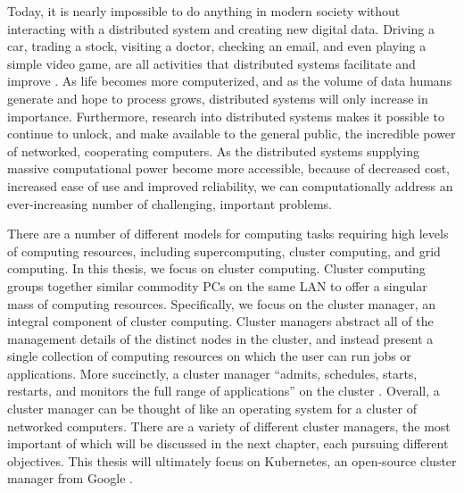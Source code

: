 Today, it is nearly impossible to do
anything in modern society without interacting with a distributed system and
creating new digital data. Driving a car, trading a stock, visiting a doctor,
checking an email, and even playing a simple video game, are all activities that
distributed systems facilitate and improve \cite{distributed-systems-concepts-and-design}.
As life becomes more
computerized, and as the volume of data humans generate and hope to process
grows, distributed systems will only increase in importance.
Furthermore, research into distributed systems makes it possible to
continue to unlock, and make available to the general public,
the incredible power of networked, cooperating computers. As the distributed systems
supplying massive computational power become more
accessible, because of decreased cost, increased ease of use and
improved reliability, we can
computationally address an ever-increasing number of challenging, important problems.

There are a number of different models for computing tasks requiring high levels
of computing resources, including supercomputing, cluster computing, and grid
computing. In this thesis, we focus on cluster computing. Cluster computing
groups together similar commodity PCs on the same LAN to offer a singular mass
of computing resources. Specifically, we focus on the
cluster manager, an integral component of cluster computing. Cluster managers
abstract all of the management details of the distinct
nodes in the cluster, and instead present a single collection of computing
resources on which the user can run jobs or applications. More succinctly,
a cluster manager ``admits, schedules, starts, restarts, and monitors the full
range of applications'' on the cluster \cite{borg}. Overall, a cluster
manager can be thought of like an operating system
for a cluster of networked computers. There are a
variety of different cluster managers, the most important of which will be
discussed in the next chapter, each pursuing different objectives. This
thesis will ultimately focus on Kubernetes, an open-source cluster
manager from Google \cite{k8s-website}.

